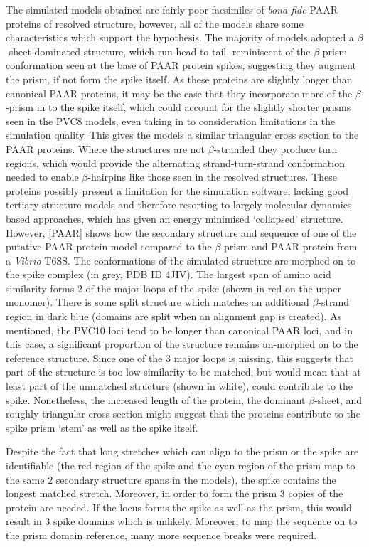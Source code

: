 The simulated models obtained are fairly poor facsimiles of \emph{bona fide} PAAR proteins of resolved structure, however, all of the models share some characteristics which support the hypothesis. The majority of models adopted a $\beta$-sheet dominated structure, which run head to tail, reminiscent of the $\beta$-prism conformation seen at the base of PAAR protein spikes, suggesting they augment the prism, if not form the spike itself. As these proteins are slightly longer than canonical PAAR proteins, it may be the case that they incorporate more of the $\beta$-prism in to the spike itself, which could account for the slightly shorter prisms seen in the PVC8 models, even taking in to consideration limitations in the simulation quality. This gives the models a similar triangular cross section to the PAAR proteins. Where the structures are not $\beta$-stranded they produce turn regions, which would provide the alternating strand-turn-strand conformation needed to enable $\beta$-hairpins like those seen in the resolved structures. These proteins possibly present a limitation for the simulation software, lacking good tertiary structure models and therefore resorting to largely molecular dynamics based approaches, which has given an energy minimised `collapsed' structure. However, \vref{PAAR} shows how the secondary structure and sequence of one of the putative PAAR protein model compared to the $\beta$-prism and PAAR protein from a \emph{Vibrio} T6SS. The conformations of the simulated structure are morphed on to the spike complex (in grey, PDB ID 4JIV). The largest span of amino acid similarity forms 2 of the major loops of the spike (shown in red on the upper monomer). There is some split structure which matches an additional $\beta$-strand region in dark blue (domains are split when an alignment gap is created). As mentioned, the PVC10 loci tend to be longer than canonical PAAR loci, and in this case, a significant proportion of the structure remains un-morphed on to the reference structure. Since one of the 3 major loops is missing, this suggests that part of the structure is too low similarity to be matched, but would mean that at least part of the unmatched structure (shown in white), could contribute to the spike. Nonetheless, the increased length of the protein, the dominant $\beta$-sheet, and roughly triangular cross section might suggest that the proteins contribute to the spike prism `stem' as well as the spike itself.

Despite the fact that long stretches which can align to the prism or the spike are identifiable (the red region of the spike and the cyan region of the prism map to the same 2 secondary structure spans in the models), the spike contains the longest matched stretch. Moreover, in order to form the prism 3 copies of the protein are needed. If the locus forms the spike as well as the prism, this would result in 3 spike domains which is unlikely. Moreover, to map the sequence on to the prism domain reference, many more sequence breaks were required.


